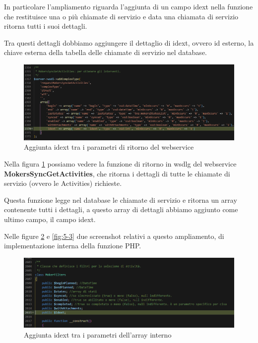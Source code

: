 \newspace
\begin{flushleft}
	In particolare l'ampliamento riguarda l'aggiunta di un campo idext nella funzione che restituisce una o più chiamate di servizio e data una chiamata di servizio ritorna tutti i suoi dettagli.
	
	Tra questi dettagli dobbiamo aggiungere il dettaglio di idext, ovvero id esterno, la chiave esterna della tabella delle chiamate di servizio nel database.
\end{flushleft}
\newspace
\begin{figure}[!h] 
	\centering
	\includegraphics[scale = 0.4]{immagini/webservices/ampliamenti/1ampl_types_changefunction} 
	\caption{Aggiunta idext tra i parametri di ritorno del webservice}
	\label{fig:5-1}
\end{figure}
\newspace
\begin{flushleft}
	Nella figura \ref{fig:5-1} possiamo vedere la funzione di ritorno in \gls{wsdlg} del webservice \textbf{MokersSyncGetActivities}, che ritorna i dettagli di tutte le chiamate di servizio (ovvero le Activities) richieste. 
	
	Questa funzione legge nel database le chiamate di servizio e ritorna un array contenente tutti i dettagli, a questo array di dettagli abbiamo aggiunto come ultimo campo, il campo idext.
\end{flushleft}

\newpage

\begin{flushleft}
	Nelle figure \ref{fig:5-2} e \ref{fig:5-3} due screenshot relativi a questo ampliamento, di implementazione interna della funzione PHP.
\end{flushleft}
\begin{figure}[!h] 
	\centering
	\includegraphics[scale = 0.5]{immagini/webservices/ampliamenti/1ampl_utils_filters.png}
	\caption{Aggiunta idext tra i parametri dell'array interno}
	\label{fig:5-2}
\end{figure}


